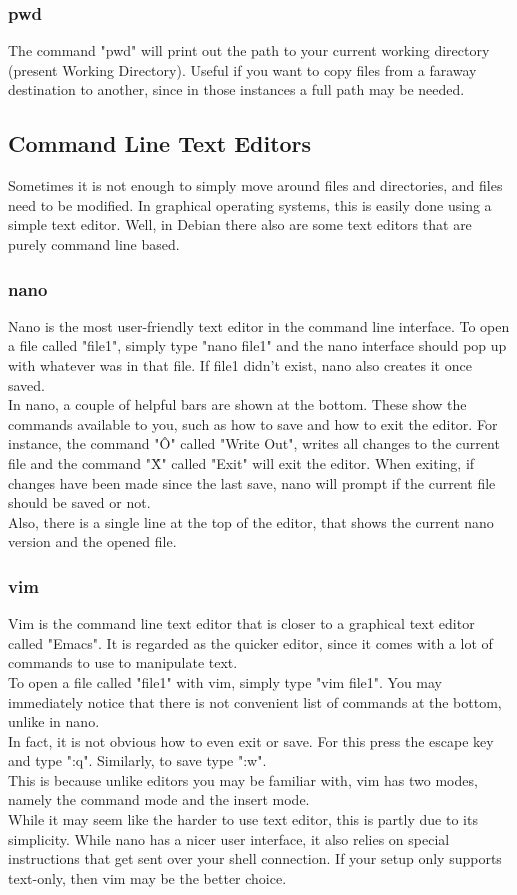 \documentclass[12pt,article]{memoir}
\begin{document}
\subsubsection{pwd}
The command "pwd" will print out the path to your current working directory (present Working Directory). Useful if you want to copy files from a faraway destination to another, since in those instances a full path may be needed.

\newpage
\subsection{Command Line Text Editors}
Sometimes it is not enough to simply move around files and directories, and files need to be modified. In graphical operating systems, this is easily done using a simple text editor. Well, in Debian there also are some text editors that are purely command line based.

\subsubsection{nano}
Nano is the most user-friendly text editor in the command line interface. To open a file called "file1", simply type "nano file1" and the nano interface should pop up with whatever was in that file. If file1 didn't exist, nano also creates it once saved.\\
In nano, a couple of helpful bars are shown at the bottom. These show the commands available to you, such as how to save and how to exit the editor. For instance, the command "\^O" called "Write Out", writes all changes to the current file and the command "\^X" called "Exit" will exit the editor. When exiting, if changes have been made since the last save, nano will prompt if the current file should be saved or not.\\
Also, there is a single line at the top of the editor, that shows the current nano version and the opened file.


\subsubsection{vim}
Vim is the command line text editor that is closer to a graphical text editor called "Emacs". It is regarded as the quicker editor, since it comes with a lot of commands to use to manipulate text.\\
To open a file called "file1" with vim, simply type "vim file1". You may immediately notice that there is not convenient list of commands at the bottom, unlike in nano.\\
In fact, it is not obvious how to even exit or save. For this press the escape key and type ":q". Similarly, to save type ":w".\\
This is because unlike editors you may be familiar with, vim has two modes, namely the command mode and the insert mode.\\
While it may seem like the harder to use text editor, this is partly due to its simplicity. While nano has a nicer user interface, it also relies on special instructions that get sent over your shell connection. If your setup only supports text-only, then vim may be the better choice.
\end{document}
